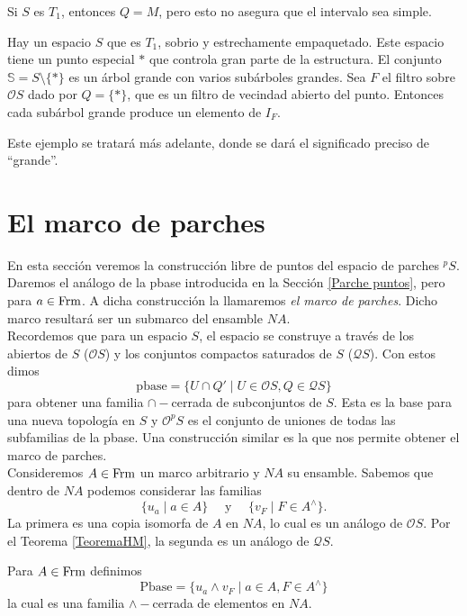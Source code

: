 Si $S$ es $T_1$, entonces $Q=M$, pero esto no asegura que el intervalo sea simple.\\

\begin{ej}
    Hay un espacio $S$ que es $T_1$, sobrio y estrechamente empaquetado. Este espacio tiene un punto especial $*$ que controla gran parte de la estructura. El conjunto $\mathbb{S}=S\setminus \{*\}$ es un árbol grande con varios subárboles grandes. Sea $F$ el filtro sobre $\mathcal{O}S$ dado por $Q=\{*\}$, que es un filtro de vecindad abierto del punto. Entonces cada subárbol grande produce un elemento de $I_F$.\\
\end{ej}

Este ejemplo se tratará más adelante, donde se dará el significado preciso de ``grande''.

\section{El marco de parches}\label{Marco de parche}

En esta sección veremos la construcción libre de puntos del espacio de parches $^pS$. Daremos el análogo de la pbase introducida en la Sección \ref{Parche puntos}, pero para $a\in \mathrm{Frm}$. A dicha construcción la llamaremos \emph{el marco de parches}. Dicho marco resultará ser un submarco del ensamble $NA$.\\

Recordemos que para un espacio $S$, el espacio se construye a través de los abiertos de $S$ ($\mathcal{O}S$) y los conjuntos compactos saturados de $S$ ($\mathcal{Q}S$). Con estos dimos 
\[
\mbox{pbase}=\{U\cap Q'\mid U\in \mathcal{O}S, Q\in \mathcal{Q}S\}
\]
para obtener una familia $\cap-$cerrada de subconjuntos de $S$. Esta es la base para una nueva topología en $S$ y $\mathcal{O}^pS$ es el conjunto de uniones de todas las subfamilias de la pbase. Una construcción similar es la que nos permite obtener el marco de parches. \\

Consideremos $A\in \mathrm{Frm}$ un marco arbitrario y $NA$ su ensamble. Sabemos que dentro de $NA$ podemos considerar las familias
\[
\{u_a\mid a\in A\}\quad\mbox{ y }\quad\{v_F\mid F\in A^\wedge\}.
\]
La primera es una copia isomorfa de $A$ en $NA$, lo cual es un análogo de $\mathcal{O}S$. Por el Teorema \ref{TeoremaHM}, la segunda es un análogo de $\mathcal{Q}S$.

\begin{dfn}\label{Definición7.1.1}
    Para $A\in\mathrm{Frm}$ definimos
    \[
    \mbox{Pbase}=\{u_a\wedge v_F\mid a\in A, F\in A^\wedge\}
    \]
    la cual es una familia $\wedge-$cerrada de elementos en $NA$.
\end{dfn}

